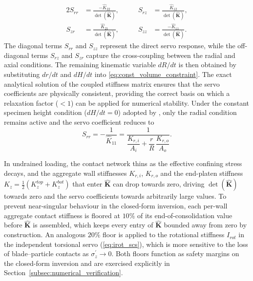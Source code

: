 \begin{alignat}{2}
S_{rr} &= \frac{-\hat{K}_{22}}{\det(\hat{\mathbf{K}})}, &\qquad
S_{rz} &= \frac{\hat{K}_{12}}{\det(\hat{\mathbf{K}})}, \label{eq:servo_coeff_r}\\[4pt]
S_{zr} &= \frac{\hat{K}_{21}}{\det(\hat{\mathbf{K}})}, &\qquad
S_{zz} &= \frac{-\hat{K}_{11}}{\det(\hat{\mathbf{K}})}. \label{eq:servo_coeff_z}
\end{alignat}
The diagonal terms $S_{rr}$ and $S_{zz}$ represent the direct servo response, while the off-diagonal terms $S_{rz}$ and $S_{zr}$ capture the cross-coupling between the radial and axial conditions. The remaining kinematic variable $dR/dt$ is then obtained by substituting $dr/dt$ and $dH/dt$ into \cref{eq:const_volume_constraint}. The exact analytical solution of the coupled stiffness matrix ensures that the servo coefficients are physically consistent, providing the correct basis on which a relaxation factor ($<1$) can be applied for numerical stability. Under the constant specimen height condition ($dH/dt=0$) adopted by \citet{Han2024jgs}, only the radial condition remains active and the servo coefficient reduces to
\begin{equation}
S_{rr} = -\frac{1}{\hat{K}_{11}} = \frac{1}{\dfrac{K_{r,i}}{A_i}+\dfrac{r}{R}\,\dfrac{K_{r,o}}{A_o}}.
\label{eq:Srr_constantH_main}
\end{equation}

In undrained loading, the contact network thins as the effective confining stress decays, and the aggregate wall stiffnesses $K_{r,i}$, $K_{r,o}$ and the end-platen stiffness $K_z=\tfrac{1}{2}(K_z^{top}+K_z^{bot})$ that enter $\hat{\mathbf{K}}$ can drop towards zero, driving $\det(\hat{\mathbf{K}})$ towards zero and the servo coefficients towards arbitrarily large values. To prevent near-singular behaviour in the closed-form inversion, each per-wall aggregate contact stiffness is floored at $10\%$ of its end-of-consolidation value before $\hat{\mathbf{K}}$ is assembled, which keeps every entry of $\hat{\mathbf{K}}$ bounded away from zero by construction. An analogous $20\%$ floor is applied to the rotational stiffness $I_{rot}$ in the independent torsional servo (\cref{eq:irot_scs}), which is more sensitive to the loss of blade--particle contacts as $\sigma_z^{\prime}\!\to\!0$. Both floors function as safety margins on the closed-form inversion and are exercised explicitly in Section~\ref{subsec:numerical_verification}.

